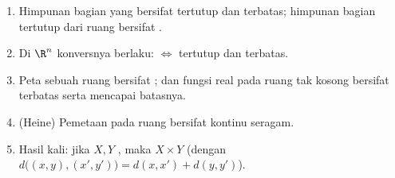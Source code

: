 \begin{theorem}\label{thm:b2:metric:compactprops}
\begin{enumerate}
  \item Himpunan bagian yang  bersifat tertutup dan terbatas;
        himpunan bagian tertutup dari ruang  bersifat .
  \item Di $\R^n$ konversnya berlaku:  $\iff$ tertutup dan
        terbatas.
  \item Peta  sebuah ruang  bersifat ; dan
        fungsi real  pada ruang  tak kosong bersifat
        terbatas serta mencapai batasnya.
  \item (Heine) Pemetaan  pada ruang  bersifat kontinu
        seragam.
  \item Hasil kali: jika $X, Y$ , maka $X \times Y$  (dengan
        $d\bigl((x,y),(x',y')\bigr) = d(x,x') + d(y,y')$).
\end{enumerate}
\end{theorem}

